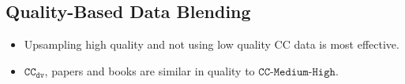 \documentclass[11pt]{article}
\newcommand{\todo}[1]{{\color{red}\bf [TODO: #1]}\xspace}
\newcommand{\ccderiv}{$\mathtt{CC_{dv}}$\xspace}
\newcommand{\ccmhq}{$\mathtt{CC}$-$\mathtt{Medium}$-$\mathtt{High}$\xspace}
\begin{document}
\subsection{Quality-Based Data Blending}
\label{subsec:crawl_data_mix}

\begin{tcolorbox}[colframe=black!80, colback=gray!10, coltitle=white, title=Insights, fonttitle=\bfseries]
\begin{itemize}
\item Upsampling high quality and not using low quality CC data is most effective.
\item \ccderiv, papers and books are similar in quality to \ccmhq.
\end{itemize}
\end{tcolorbox}



\end{document}
